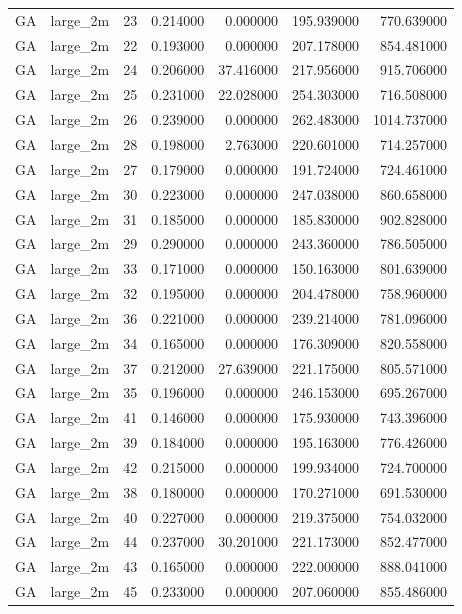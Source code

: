\begin{tabular}{llrrrrr}
GA & large_2m & 23 & 0.214000 & 0.000000 & 195.939000 & 770.639000 \\
GA & large_2m & 22 & 0.193000 & 0.000000 & 207.178000 & 854.481000 \\
GA & large_2m & 24 & 0.206000 & 37.416000 & 217.956000 & 915.706000 \\
GA & large_2m & 25 & 0.231000 & 22.028000 & 254.303000 & 716.508000 \\
GA & large_2m & 26 & 0.239000 & 0.000000 & 262.483000 & 1014.737000 \\
GA & large_2m & 28 & 0.198000 & 2.763000 & 220.601000 & 714.257000 \\
GA & large_2m & 27 & 0.179000 & 0.000000 & 191.724000 & 724.461000 \\
GA & large_2m & 30 & 0.223000 & 0.000000 & 247.038000 & 860.658000 \\
GA & large_2m & 31 & 0.185000 & 0.000000 & 185.830000 & 902.828000 \\
GA & large_2m & 29 & 0.290000 & 0.000000 & 243.360000 & 786.505000 \\
GA & large_2m & 33 & 0.171000 & 0.000000 & 150.163000 & 801.639000 \\
GA & large_2m & 32 & 0.195000 & 0.000000 & 204.478000 & 758.960000 \\
GA & large_2m & 36 & 0.221000 & 0.000000 & 239.214000 & 781.096000 \\
GA & large_2m & 34 & 0.165000 & 0.000000 & 176.309000 & 820.558000 \\
GA & large_2m & 37 & 0.212000 & 27.639000 & 221.175000 & 805.571000 \\
GA & large_2m & 35 & 0.196000 & 0.000000 & 246.153000 & 695.267000 \\
GA & large_2m & 41 & 0.146000 & 0.000000 & 175.930000 & 743.396000 \\
GA & large_2m & 39 & 0.184000 & 0.000000 & 195.163000 & 776.426000 \\
GA & large_2m & 42 & 0.215000 & 0.000000 & 199.934000 & 724.700000 \\
GA & large_2m & 38 & 0.180000 & 0.000000 & 170.271000 & 691.530000 \\
GA & large_2m & 40 & 0.227000 & 0.000000 & 219.375000 & 754.032000 \\
GA & large_2m & 44 & 0.237000 & 30.201000 & 221.173000 & 852.477000 \\
GA & large_2m & 43 & 0.165000 & 0.000000 & 222.000000 & 888.041000 \\
GA & large_2m & 45 & 0.233000 & 0.000000 & 207.060000 & 855.486000 \\

\end{tabular}
